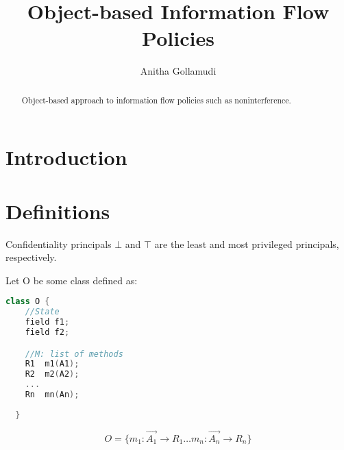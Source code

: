 \documentclass[acmsmall,screen,review, nonacm]{acmart}
\begin{document}
\title{Object-based Information Flow Policies}

\author{Anitha Gollamudi}
\begin{abstract}
 Object-based approach to information flow policies such as noninterference.
\end{abstract}


\maketitle

\section{Introduction}


\section{Definitions}

\begin{definition}[Principals]
Confidentiality principals  $\bot$ and $\top$ are  the least and most privileged principals, respectively.
\end{definition}

Let O be some class defined as:
\begin{lstlisting}[language=C++, commentstyle=\color{codegreen}, keywordstyle=\color{magenta}]
  class O {
    //State
    field f1;  
    field f2;  

    //M: list of methods
    R1  m1(A1); 
    R2  m2(A2);
    ...
    Rn  mn(An);
    
  }
\end{lstlisting}

\begin{definition}
\[
O = \{ m_1: \vec{A_1} \to R_1 \dots  m_n: \vec{A_n} \to R_n \}
\]
\end{definition}
\end{document}
